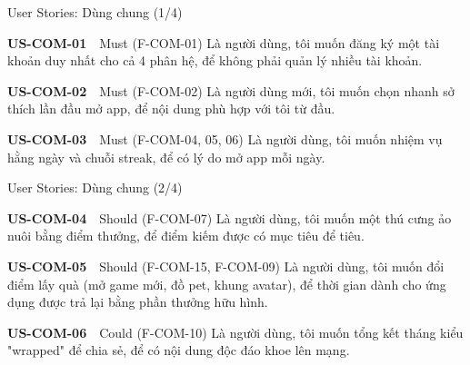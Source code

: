 \begin{frame}{User Stories: Dùng chung (1/4)}
\linespread{0.85}
\begin{block}{\scriptsize\bfseries US-COM-01}~~Must \tiny(F-COM-01)
{\scriptsize Là người dùng, tôi muốn đăng ký một tài khoản duy nhất cho cả 4 phân hệ, để không phải quản lý nhiều tài khoản.}
\end{block}
\vspace{1pt}
\begin{block}{\scriptsize\bfseries US-COM-02}~~Must \tiny(F-COM-02)
{\scriptsize Là người dùng mới, tôi muốn chọn nhanh sở thích lần đầu mở app, để nội dung phù hợp với tôi từ đầu.}
\end{block}
\vspace{1pt}
\begin{block}{\scriptsize\bfseries US-COM-03}~~Must \tiny(F-COM-04, 05, 06)
{\scriptsize Là người dùng, tôi muốn nhiệm vụ hằng ngày và chuỗi streak, để có lý do mở app mỗi ngày.}
\end{block}
\vspace{1pt}
\end{frame}

\begin{frame}{User Stories: Dùng chung (2/4)}
\linespread{0.85}
\begin{block}{\scriptsize\bfseries US-COM-04}~~Should \tiny(F-COM-07)
{\scriptsize Là người dùng, tôi muốn một thú cưng ảo nuôi bằng điểm thưởng, để điểm kiếm được có mục tiêu để tiêu.}
\end{block}
\vspace{1pt}
\begin{block}{\scriptsize\bfseries US-COM-05}~~Should \tiny(F-COM-15, F-COM-09)
{\scriptsize Là người dùng, tôi muốn đổi điểm lấy quà (mở game mới, đồ pet, khung avatar), để thời gian dành cho ứng dụng được trả lại bằng phần thưởng hữu hình.}
\end{block}
\vspace{1pt}
\begin{block}{\scriptsize\bfseries US-COM-06}~~Could \tiny(F-COM-10)
{\scriptsize Là người dùng, tôi muốn tổng kết tháng kiểu "wrapped" để chia sẻ, để có nội dung độc đáo khoe lên mạng.}
\end{block}
\vspace{1pt}
\end{frame}

